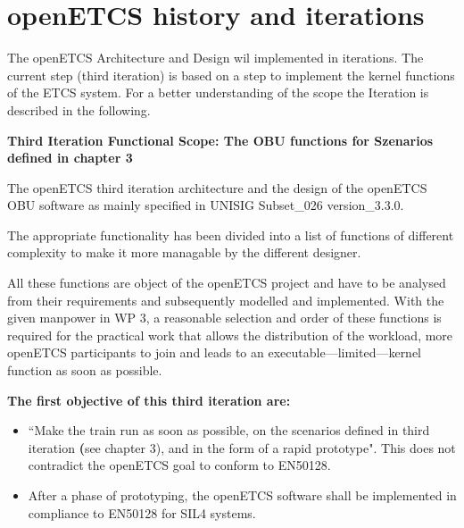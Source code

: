 \section{openETCS history and iterations}
The openETCS Architecture and Design wil implemented in iterations. The current step (third iteration) is based on a step to implement the kernel functions of the ETCS system. For a better understanding of the scope the Iteration is described in the following.

\textbf{Third Iteration Functional Scope: The OBU functions for Szenarios defined in chapter 3}

The openETCS third iteration architecture and the design of the openETCS OBU software as mainly specified in \cite{subset-026} UNISIG Subset\_026 version\_3.3.0. 

The appropriate functionality has been divided into a list of functions of different complexity to make it more managable by the different designer.

All these functions are object of the openETCS project and have to be analysed from their requirements and subsequently modelled and implemented. With the given manpower in WP 3, a reasonable selection and order of these functions is required for the practical work that allows the distribution of the workload, more openETCS participants to join and leads to an executable---limited---kernel function as soon as possible. 


\textbf{The first objective of this third iteration are:}
\begin{itemize}
\item ``Make the train run as soon as possible, on the scenarios defined in third iteration \textbf(see chapter 3), and in the form of a rapid prototype".
This does not contradict the openETCS goal to conform to EN50128.
\item After a phase of prototyping, the openETCS software shall be implemented in compliance to EN50128 for SIL4 systems.
\end{itemize}


